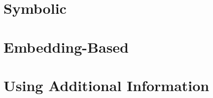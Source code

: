 \section{Symbolic}
\label{sec:3_related_work/1_symbolic}



\section{Embedding-Based}
\label{sec:3_related_work/2_embedding_based}



\section{Using Additional Information}
\label{sec:3_related_work/3_additional_information}

